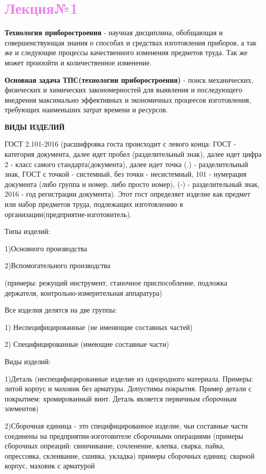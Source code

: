 {\Large\section*{\textcolor{violet}{Лекция№1}}
 \begin{center}
     \par \textbf{Технология приборостроения} - научная дисциплина, обобщающая и совершенствующая знания о способах и средствах изготовления приборов, а так же и следующие процессы качественного изменения предметов труда. Так же может произойти и количественное изменение.
     \par \textbf{Основная задача ТПС(технологии приборостроения)} - поиск механических, физических и химических закономерностей для выявления и последующего внедрения максимально эффективных и экономичных процеесов изготовления, требующих наименьших затрат времени и ресурсов.
     \par \textbf{ВИДЫ ИЗДЕЛИЙ} 
     \par ГОСТ 2.101-2016 (расшифровка госта происходит с левого конца: ГОСТ - категория документа, далее идет пробел (разделительный знак), далее идет цифра 2 - класс самого стандарта(документа), далее идет точка (.) - разделительный знак, ГОСТ с точкой - системный, без точки - несистемный, 101 - нумерация документа (либо группа и номер, либо просто номер), (-) - разделительный знак, 2016 - год регистрации документа). Этот гост определяет изделие как предмет или набор предметов труда, подлежащих изготовлению в организации(предприятие-изготовитель). 
     \par Типы изделий: 
     \par 1)Основного производства
     \par 2)Вспомогательного производства 
     \par (примеры: режущий инструмент, станочное приспособление, подложка держателя, контрольно-измерительная аппаратура)
     \par Все изделия делятся на две группы:
     \par 1) Неспецифицированные (не именющие составных частей)
     \par 2) Специфицированные (имеющие составные части)
     \par Виды изделий:
     \par 1)Деталь (неспецифицированные изделие из однородного материала. Примеры: литой корпус и маховик без арматуры. Допустимы покрытия. Пример детали с покрытием: хромированный винт. Деталь является первичным сборочным элементов)
     \par 2)Сборочная единица - это специфицированное изделие, чьи составные части соединены на предприятии-изготовителе сборочными операциями (примеры сборочных опреаций: свинчивание, сочленение, клепка, сварка, пайка, опрессовка, склеивание, сшивка, укладка) примеры сборочных единиц: сварной корпус, маховик с арматурой

\end{center}}
